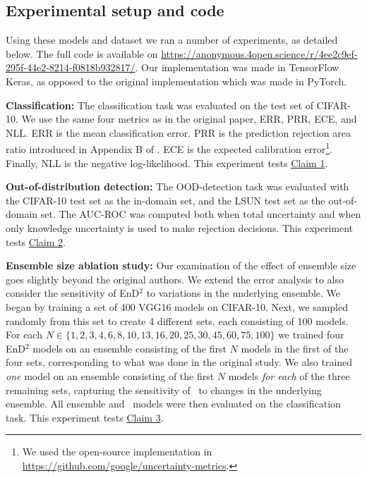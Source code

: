 \subsection{Experimental setup and code}
Using these models and dataset we ran a number of experiments, as detailed below. The full code is available on \href{z}{https://anonymous.4open.science/r/4ee2c9ef-295f-44e2-8214-f0818b932817/}. Our implementation was made in TensorFlow Keras, as opposed to the original implementation which was made in PyTorch.

\textbf{Classification:} The classification task was evaluated on the test set of CIFAR-10. We use the same four metrics as in the original paper, ERR, PRR, ECE, and NLL. ERR is the mean classification error. PRR is the prediction rejection area ratio introduced in Appendix B of \cite{malinin2019ensemble}. ECE is the expected calibration error\footnote{We used the open-source implementation in \url{https://github.com/google/uncertainty-metrics}.}. Finally, NLL is the negative log-likelihood. This experiment tests \hyperlink{claim1}{Claim 1}. 

\textbf{Out-of-distribution detection:} The OOD-detection task was evaluated with the CIFAR-10 test set as the in-domain set, and the LSUN test set as the out-of-domain set. The AUC-ROC was computed both when total uncertainty and when only knowledge uncertainty is used to make rejection decisions. This experiment tests \hyperlink{claim2}{Claim 2}. 

\textbf{Ensemble size ablation study:} Our examination of the effect of ensemble size goes slightly beyond the original authors. We extend the error analysis to also consider the sensitivity of EnD$^2$ to variations in the underlying ensemble. We began by training a set of 400 VGG16 models on CIFAR-10. Next, we sampled randomly from this set to create 4 different sets, each consisting of 100 models. \\ For each $N \in \{1, 2, 3, 4, 6, 8, 10, 13, 16, 20, 25, 30, 45, 60, 75, 100\}$ we trained four EnD$^2$ models on an ensemble consisting of the first $N$ models in the first of the four sets, corresponding to what was done in the original study. We also trained \textit{one} model on an ensemble consisting of the first $N$ models \textit{for each} of the three remaining sets, capturing the sensitivity of \EnDD \ to changes in the underlying ensemble. All ensemble and \EnDD \ models were then evaluated on the classification task. This experiment tests \hyperlink{claim3}{Claim 3}. 

